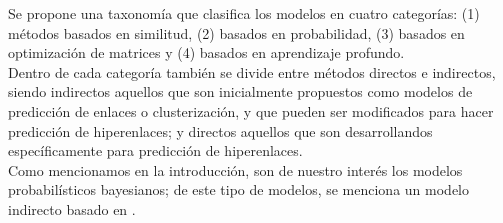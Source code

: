 Se propone una taxonomía que clasifica los modelos en cuatro categorías: (1) métodos basados en similitud, (2) basados en probabilidad, (3) basados en optimización de matrices y (4) basados en aprendizaje profundo.\\

Dentro de cada categoría también se divide entre métodos directos e indirectos, siendo indirectos aquellos que son inicialmente propuestos como modelos de predicción de enlaces o clusterización, y que pueden ser modificados para hacer predicción de hiperenlaces; y directos aquellos que son desarrollandos específicamente para predicción de hiperenlaces.\\

Como mencionamos en la introducción, son de nuestro interés los modelos probabilísticos bayesianos; de este tipo de modelos, se menciona un modelo indirecto basado en \cite{NIPS2005_182e6c2d}.\\